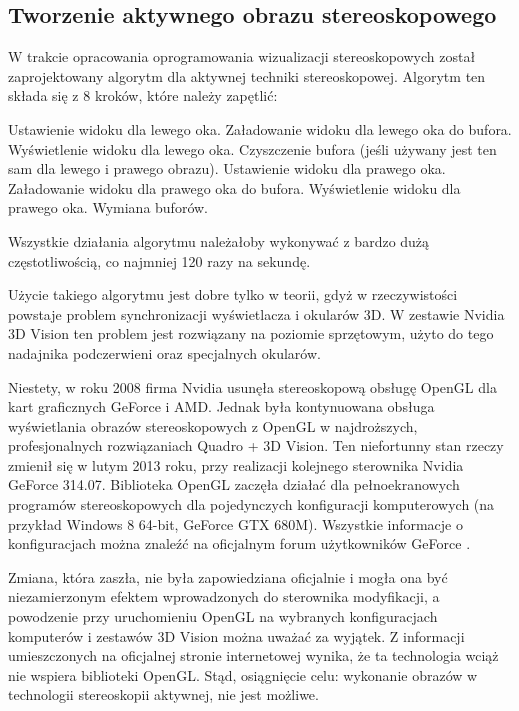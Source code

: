 \subsection{Tworzenie aktywnego obrazu stereoskopowego} 
W trakcie opracowania oprogramowania wizualizacji stereoskopowych został zaprojektowany algorytm dla aktywnej techniki stereoskopowej. Algorytm ten składa się z 8 kroków, które należy zapętlić:

\begin{itemize}
\itemi Ustawienie widoku dla lewego oka.
\itemi Załadowanie widoku dla lewego oka do bufora.
\itemi Wyświetlenie widoku dla lewego oka.
\itemi Czyszczenie bufora (jeśli używany jest ten sam dla lewego i prawego obrazu).
\itemi Ustawienie widoku dla prawego oka.
\itemi Załadowanie widoku dla prawego oka do bufora.
\itemi Wyświetlenie widoku dla prawego oka.
\itemi Wymiana buforów.
\end{itemize}

Wszystkie działania algorytmu należałoby wykonywać z bardzo dużą częstotliwością, co najmniej 120 razy na sekundę.

Użycie takiego algorytmu jest dobre tylko w teorii, gdyż w rzeczywistości powstaje problem synchronizacji wyświetlacza i okularów 3D. W zestawie Nvidia 3D Vision ten problem jest rozwiązany na poziomie sprzętowym, użyto do tego nadajnika podczerwieni oraz specjalnych okularów.

Niestety, w roku 2008 firma Nvidia usunęła stereoskopową obsługę OpenGL dla kart graficznych GeForce i AMD. Jednak była kontynuowana obsługa wyświetlania obrazów stereoskopowych z OpenGL w najdroższych, profesjonalnych rozwiązaniach Quadro + 3D Vision. Ten niefortunny stan rzeczy zmienił się w lutym 2013 roku, przy realizacji kolejnego sterownika Nvidia GeForce 314.07. Biblioteka OpenGL zaczęła działać dla pełnoekranowych programów stereoskopowych dla pojedynczych konfiguracji komputerowych (na przykład Windows 8 64-bit, GeForce GTX 680M). Wszystkie informacje o konfiguracjach można znaleźć na oficjalnym forum użytkowników GeForce \cite{GeForceForum}.

Zmiana, która zaszła, nie była zapowiedziana oficjalnie i mogła ona być niezamierzonym efektem wprowadzonych do sterownika modyfikacji, a powodzenie przy uruchomieniu OpenGL na wybranych konfiguracjach komputerów i zestawów 3D Vision można uważać za wyjątek. Z informacji umieszczonych na oficjalnej stronie internetowej \cite{NvidiaInfo} wynika, że ta technologia wciąż nie wspiera biblioteki OpenGL. Stąd, osiągnięcie celu: wykonanie obrazów w technologii stereoskopii aktywnej, nie jest możliwe.

